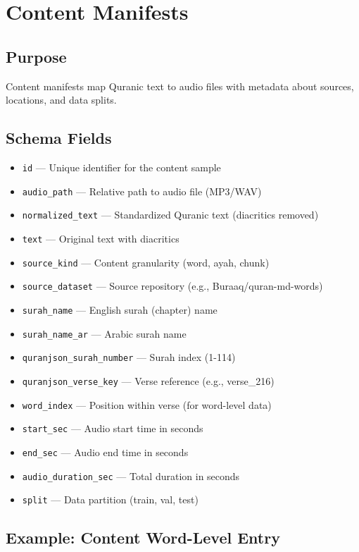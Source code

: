 \section{Content Manifests}

\subsection{Purpose}
Content manifests map Quranic text to audio files with metadata about sources, locations, and data splits.

\subsection{Schema Fields}

\begin{itemize}
  \item \texttt{id} — Unique identifier for the content sample
  \item \texttt{audio\_path} — Relative path to audio file (MP3/WAV)
  \item \texttt{normalized\_text} — Standardized Quranic text (diacritics removed)
  \item \texttt{text} — Original text with diacritics
  \item \texttt{source\_kind} — Content granularity (word, ayah, chunk)
  \item \texttt{source\_dataset} — Source repository (e.g., Buraaq/quran-md-words)
  \item \texttt{surah\_name} — English surah (chapter) name
  \item \texttt{surah\_name\_ar} — Arabic surah name
  \item \texttt{quranjson\_surah\_number} — Surah index (1-114)
  \item \texttt{quranjson\_verse\_key} — Verse reference (e.g., verse\_216)
  \item \texttt{word\_index} — Position within verse (for word-level data)
  \item \texttt{start\_sec} — Audio start time in seconds
  \item \texttt{end\_sec} — Audio end time in seconds
  \item \texttt{audio\_duration\_sec} — Total duration in seconds
  \item \texttt{split} — Data partition (train, val, test)
\end{itemize}

\subsection{Example: Content Word-Level Entry}

